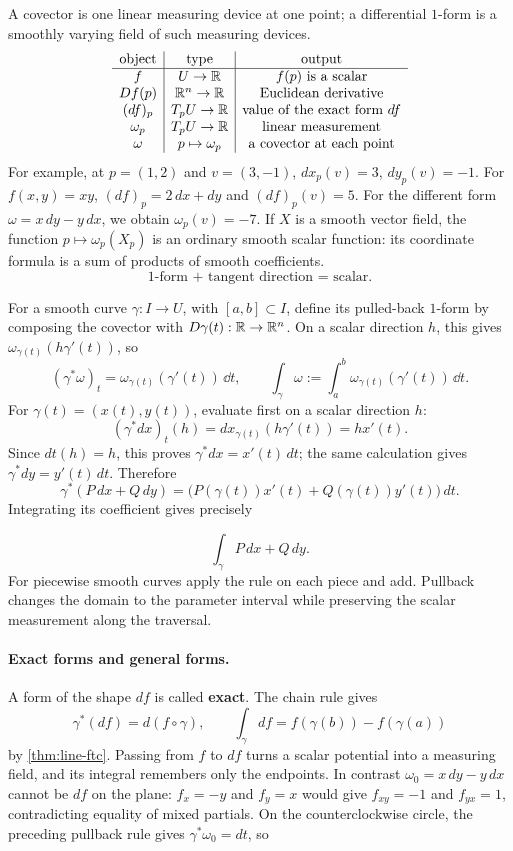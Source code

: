 A covector is one linear measuring device at one point; a differential
$1$-form is a smoothly varying field of such measuring devices.
\[
\begin{array}{c|c|c}
\text{object}&\text{type}&\text{output}\\\hline
f&U\to\mathbb{R}&f(p)\text{ is a scalar}\\
Df(p)&\mathbb{R}^n\to\mathbb{R}&\text{Euclidean derivative}\\
(df)_p&T_pU\to\mathbb{R}&\text{value of the exact form $df$}\\
\omega_p&T_pU\to\mathbb{R}&\text{linear measurement}\\
\omega&p\mapsto\omega_p&\text{a covector at each point}
\end{array}
\]
For example, at $p=(1,2)$ and $v=(3,-1)$,
$dx_p(v)=3$, $dy_p(v)=-1$. For $f(x,y)=xy$,
$(df)_p=2\,dx+dy$ and $(df)_p(v)=5$. For the different form
$\omega=x\,dy-y\,dx$, we obtain $\omega_p(v)=-7$.
If $X$ is a smooth vector field, the function
$p\mapsto\omega_p(X_p)$ is an ordinary smooth scalar function:
its coordinate formula is a sum of products of smooth coefficients.
\[
\boxed{\text{$1$-form + tangent direction = scalar}.}
\]

For a smooth curve $\gamma:I\to U$, with $[a,b]\subset I$, define its pulled-back $1$-form by
composing the covector with $D\gamma(t):\mathbb{R}\to\mathbb{R}^n$. On a scalar direction
$h$, this gives $\omega_{\gamma(t)}(h\gamma'(t))$, so
\[
(\gamma^*\omega)_t=\omega_{\gamma(t)}(\gamma'(t))\,\dd t,
\qquad
\int_\gamma\omega:=\int_a^b\omega_{\gamma(t)}(\gamma'(t))\,\dd t.
\]
For $\gamma(t)=(x(t),y(t))$, evaluate first on a scalar direction $h$:
\[
(\gamma^*dx)_t(h)=dx_{\gamma(t)}(h\gamma'(t))=hx'(t).
\]
Since $dt(h)=h$, this proves $\gamma^*dx=x'(t)\,dt$; the same
calculation gives $\gamma^*dy=y'(t)\,dt$. Therefore
\[
\gamma^*(P\,dx+Q\,dy)
=\bigl(P(\gamma(t))x'(t)+Q(\gamma(t))y'(t)\bigr)\,dt.
\]
Integrating its coefficient gives precisely

\[
\int_\gamma P\,dx+Q\,dy.
\]
 For piecewise smooth curves apply the rule
on each piece and add. Pullback changes the domain to the parameter
interval while preserving the scalar measurement along the traversal.

\paragraph{Exact forms and general forms.}
A form of the shape $df$ is called \textbf{exact}. The chain rule gives
\[
\gamma^*(df)=d(f\circ\gamma),\qquad
\int_\gamma df=f(\gamma(b))-f(\gamma(a))
\]
by \cref{thm:line-ftc}. Passing from $f$ to $df$ turns a scalar potential
into a measuring field, and its integral remembers only the endpoints.
In contrast $\omega_0=x\,dy-y\,dx$ cannot be $df$ on the plane:
$f_x=-y$ and $f_y=x$ would give $f_{xy}=-1$ and $f_{yx}=1$,
contradicting equality of mixed partials. On the counterclockwise circle,
the preceding pullback rule gives $\gamma^*\omega_0=dt$, so

